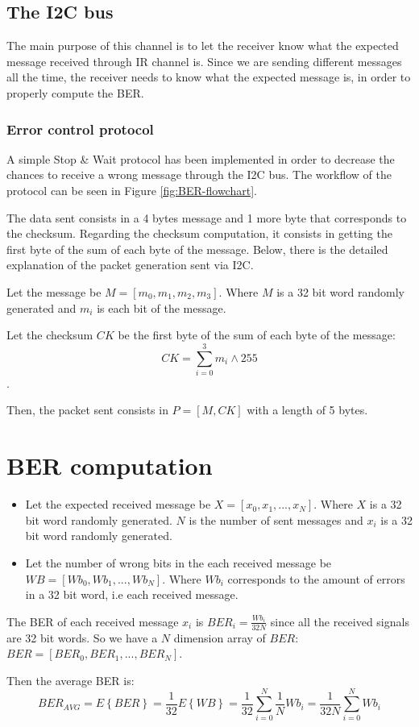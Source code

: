 \documentclass{article}
\begin{document}
\subsection{The I2C bus}
The main purpose of this channel is to let the receiver know what the expected message
received through IR channel is. Since we are sending different messages all the time, 
the receiver needs to know what the expected message is, in order to properly
compute the BER. 

\subsubsection{Error control protocol}

A simple Stop \& Wait protocol has been implemented in order to decrease
the chances to receive a wrong message through the I2C bus. The workflow
of the protocol can be seen in Figure \ref{fig:BER-flowchart}. 

The data 
sent consists in a 4 bytes message and 1 more byte that corresponds to the checksum. Regarding
the checksum computation, it consists in getting the first byte of the
sum of each byte of the message. Below, there is the detailed explanation of the packet generation
sent via I2C.

Let the message be \(M = [m_{0}, m_{1}, m_{2}, m_{3}]\).  Where \(M\) is a
32 bit word randomly generated and \(m_{i}\) is each bit of the message.

Let the checksum \(CK\) be the first byte of the sum of each byte of the message:
\[CK = \sum_{i=0}^3m_{i} \wedge 255\].

Then, the packet sent consists in \(P = [M,CK]\) with a length of 5 bytes.

\section{BER computation}

\begin{itemize}

  \item Let the expected received message be \(X = [x_{0}, x_{1}, ..., x_{N}]\).
   Where \(X\) is a 32 bit word randomly generated. \(N\) is the number
   of sent messages and \(x_{i}\) is a 32 bit word randomly generated.

  
  \item Let the number of wrong bits in the each received message be 
  \(WB = [Wb_{0}, Wb_{1} , ..., Wb_{N}]\). Where \(Wb_{i} \)
  corresponds to the amount of errors in a 32 bit word, i.e each
  received message.

\end{itemize}

The BER of each received message \(x_{i}\) is
\(BER_{i} = \frac{Wb_{i}}{32N}\) since all the received signals are
32 bit words. So we have a \(N\) dimension array of
\(BER\): \(BER = [BER_{0}, BER_{1}, ...,BER_{N}]\).

Then the average BER is:
\[BER_{AVG} = E\left\{BER\right\} = \frac{1}{32}E\left\{WB\right\}=\frac{1}{32}\sum_{i=0}^{N}\frac{1}{N}Wb_{i} = \frac{1}{32N}\sum_{i=0}^{N}Wb_{i}\]
\end{document}
